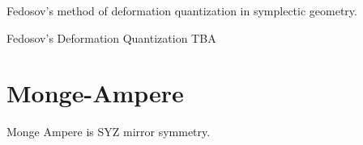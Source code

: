 \documentclass{article}
\begin{document}
\noindent
Fedosov's method of deformation quantization in symplectic geometry.

\begin{definition}{Fedosov's Deformation Quantization}{}
TBA
\end{definition}


\begin{definition}{}{}
\end{definition}



\section {Monge-Ampere}

\noindent
Monge Ampere is SYZ mirror symmetry.


\begin{definition}{}{}
\end{definition}





\nocite{*}
\printbibliography
\end{document}

